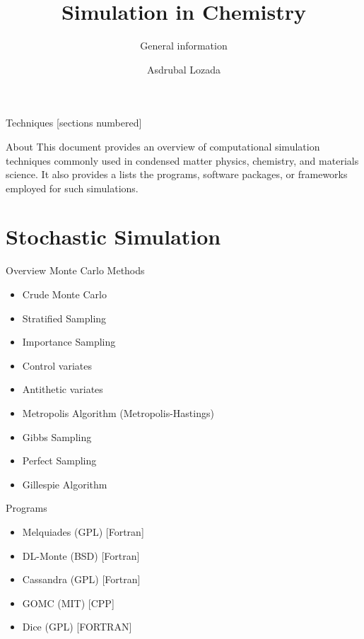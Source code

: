 \documentclass[10pt]{beamer}
\title{Simulation in Chemistry}
\subtitle{General information}
\date{}
\author{Asdrubal Lozada}
\begin{document}
\maketitle

\begin{frame}{Techniques}
  [sections numbered]
  \tableofcontents%
\end{frame}

\begin{frame}[frame]{About}
    This document provides an overview of computational simulation techniques commonly used in condensed matter physics, chemistry, and materials science. It also provides a lists the programs, software packages, or frameworks employed for such simulations.
\end{frame}

\section[Stochastic]{Stochastic Simulation}

\begin{frame}{Overview}
Monte Carlo Methods
\begin{itemize}
    \item Crude Monte Carlo
    \item Stratified Sampling
    \item Importance Sampling
    \item Control variates
    \item Antithetic variates
    \item Metropolis Algorithm (Metropolis-Hastings)
    \item Gibbs Sampling
    \item Perfect Sampling
    \item Gillespie Algorithm
\end{itemize}

\end{frame}

\begin{frame}[fragile]{Programs}

  \begin{itemize}
      \item Melquiades (GPL) [Fortran]
      \item DL-Monte (BSD) [Fortran]
      \item Cassandra (GPL) [Fortran]
      \item GOMC (MIT) [CPP]
      \item Dice (GPL) [FORTRAN]
  \end{itemize}
\end{frame}
\end{document}
